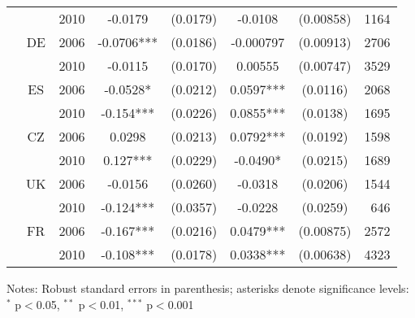 \begin{threeparttable}
\begin{tabular}{cccSSSSr}
&    & 2010 & -0.0179    & (0.0179)  & -0.0108   & (0.00858) & 1164  \\[1ex]
& DE & 2006 & -0.0706*** & (0.0186)  & -0.000797 & (0.00913) & 2706  \\
&    & 2010 & -0.0115    & (0.0170)  & 0.00555   & (0.00747) & 3529  \\[1ex]
& ES & 2006 & -0.0528*   & (0.0212)  & 0.0597*** & (0.0116)  & 2068  \\
&    & 2010 & -0.154***  & (0.0226)  & 0.0855*** & (0.0138)  & 1695  \\[1ex]
& CZ & 2006 & 0.0298     & (0.0213)  & 0.0792*** & (0.0192)  & 1598  \\
&    & 2010 & 0.127***   & (0.0229)  & -0.0490*  & (0.0215)  & 1689  \\[1ex]
& UK & 2006 & -0.0156    & (0.0260)  & -0.0318   & (0.0206)  & 1544  \\
&    & 2010 & -0.124***  & (0.0357)  & -0.0228   & (0.0259)  & 646   \\[1ex]
& FR & 2006 & -0.167***  & (0.0216)  & 0.0479*** & (0.00875) & 2572  \\
&    & 2010 & -0.108***  & (0.0178)  & 0.0338*** & (0.00638) & 4323  \\
\bottomrule%
\end{tabular}
%
\begin{tablenotes}
\item Notes: Robust standard errors in parenthesis; asterisks denote significance levels: $^{*}$ p$<$0.05, $^{**}$ p$<$0.01, $^{***}$ p$<$0.001
\end{tablenotes}
%
\setlength{\tabcolsep}{6pt}
%
\end{threeparttable}
